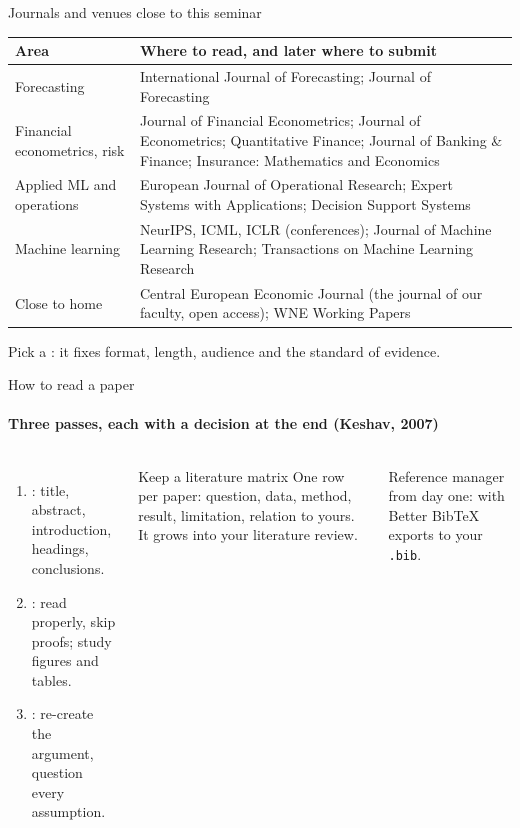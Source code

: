 \documentclass[aspectratio=169,11pt,t]{beamer}
\begin{document}
\begin{frame}{Journals and venues close to this seminar}
  \footnotesize
  \begin{tabular}{@{}>{\raggedright}p{}>{\raggedright\arraybackslash}p{}@{}}
    \toprule
    \textbf{Area} & \textbf{Where to read, and later where to submit} \\
    \midrule
    Forecasting & International Journal of Forecasting; Journal of Forecasting \\
    \addlinespace
    Financial econometrics, risk & Journal of Financial Econometrics; Journal of Econometrics;
      Quantitative Finance; Journal of Banking \& Finance; Insurance: Mathematics and Economics \\
    \addlinespace
    Applied ML and operations & European Journal of Operational Research; Expert Systems with
      Applications; Decision Support Systems \\
    \addlinespace
    Machine learning & NeurIPS, ICML, ICLR (conferences); Journal of Machine Learning Research;
      Transactions on Machine Learning Research \\
    \addlinespace
    Close to home & Central European Economic Journal (the journal of our faculty, open access);
      WNE Working Papers \\
    \bottomrule
  \end{tabular}

  \medskip
  \normalsize
  Pick a : it fixes format, length, audience and the standard of evidence.
\end{frame}

\begin{frame}{How to read a paper}
  \framesubtitle{Three passes, each with a decision at the end (Keshav, 2007)}
  \begin{columns}[T,onlytextwidth]
    \begin{enumerate}
      \item {}: title, abstract, introduction, headings, conclusions.
      \item {}: read properly, skip proofs; study figures and tables.
      \item {}: re-create the argument, question every assumption.
    \end{enumerate}
    \begin{block}{Keep a literature matrix}
      \small One row per paper: question, data, method, result, limitation, relation to yours.
      It grows into your literature review.
    \end{block}
    \smallskip
    \small Reference manager from day one:  with Better BibTeX exports to your \texttt{.bib}.
  \end{columns}
\end{frame}
\end{document}
